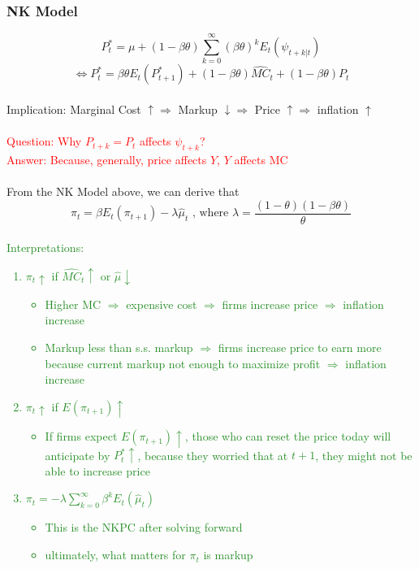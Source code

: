 \documentclass{article}
\begin{document}
\subsubsection{NK Model}
$$P_t^* = \mu + (1-\beta\theta)\sum_{k=0}^\infty(\beta\theta)^k E_t(\psi_{t+k|t})$$
$$\Leftrightarrow P_t^* = \beta \theta E_t (P_{t+1}^*) + (1-\beta\theta)\hat{MC}_t + (1-\beta\theta)P_t$$
\\
{\color{ForestGreen}Implication: Marginal Cost $\uparrow \Rightarrow$ Markup $\downarrow \Rightarrow$ Price $\uparrow \Rightarrow$ inflation $\uparrow$}\\
\\
\textcolor{red}{Question: Why $P_{t+k}  = P_t$ affects $\psi_{t+k}$?\\
Answer: Because, generally, price affects $Y$, $Y$ affects MC}\\
\\
From the NK Model above, we can derive that 
$$\pi_t = \beta E_t(\pi_{t+1}) - \lambda\hat{\mu}_t\text{ , where } \lambda = \frac{(1-\theta)(1-\beta\theta)}{\theta}$$
\\
\textcolor{ForestGreen}{Interpretations:}
\textcolor{ForestGreen}{
\begin{enumerate}
    \item $\pi_t\uparrow$ if $\hat{MC}_t \uparrow$ or $\hat{\mu} \downarrow$
    \textcolor{ForestGreen}{
    \begin{itemize}
        \item Higher MC $\Rightarrow$ expensive cost $\Rightarrow$ firms increase price $\Rightarrow$ inflation increase
        \item Markup less than s.s. markup $\Rightarrow$ firms increase price to earn more because current markup not enough to maximize profit $\Rightarrow$ inflation increase
    \end{itemize}}
    \item \textcolor{ForestGreen}{$\pi_t\uparrow$ if $E(\pi_{t+1})\uparrow$
    \begin{itemize}
        \item If firms expect $E(\pi_{t+1})\uparrow$, those who can reset the price today will anticipate by $P_t^*\uparrow$, because they worried that at $t+1$, they might not be able to increase price
    \end{itemize}}
    \item \textcolor{ForestGreen}{$\pi_t = -\lambda \sum_{k=0}^\infty \beta^k E_t(\hat{\mu}_t)$
    \begin{itemize}
        \item This is the NKPC after solving forward
        \item ultimately, what matters for $\pi_t$ is markup
    \end{itemize}}
\end{enumerate}}
\end{document}
